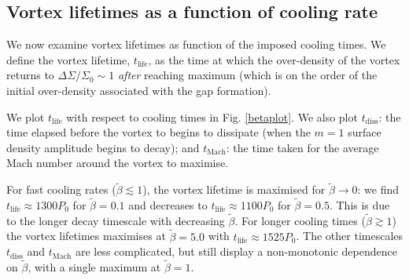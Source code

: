 

\subsection{Vortex lifetimes as a function of cooling
  rate}\label{lifetime_discuss} 

We now examine vortex lifetimes as function of the imposed cooling
times. We define the vortex lifetime, $t_{\mathrm{life}}$, as the time
at which the over-density of the vortex
returns to $\Delta \Sigma/\Sigma_0\sim1$ \emph{after} reaching maximum
 (which is on the order of the
initial over-density associated with the gap formation). 

We plot $t_{\mathrm{life}}$ with respect to cooling times in
Fig. \ref{betaplot}. We also plot $t_{\mathrm{diss}}$: the time elapsed before the
vortex to begins to dissipate (when the $m=1$ surface density
amplitude begins to decay); and $t_{\mathrm{Mach}}$: the time taken
for the average Mach number around the vortex to maximise. 

For fast cooling rates ($\tilde{\beta}\lesssim 1$), the
vortex lifetime is maximised for $\tilde{\beta}\to0$: we find 
$t_{\mathrm{life}} \approx 1300P_0$ for $\tilde{\beta}=0.1$ and 
decreases to $t_{\mathrm{life}} \approx 1100P_0$ for
$\tilde{\beta}=0.5$. This is due to the longer decay timescale with
decreasing $\tilde{\beta}$. For longer cooling times ($\tilde{\beta}\gtrsim
1$) the vortex lifetimes maximises at $\tilde\beta=5.0$ with 
$t_{\mathrm{life}}\approx 1525P_0$.  The other timescales $t_\mathrm{diss}$ and
$t_\mathrm{Mach}$ are less complicated, but still display a
non-monotonic dependence on $\tilde{\beta}$, with a single maximum at
$\tilde{\beta}=1$. 


